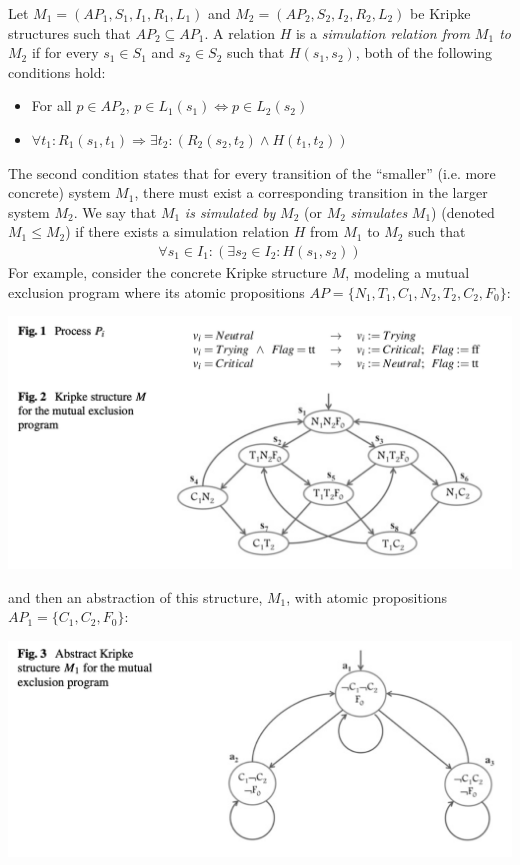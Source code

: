 \documentclass[10pt,a4paper]{article}
\begin{document}
Let $M_1=(AP_1,S_1,I_1,R_1,L_1)$ and $M_2=(AP_2,S_2,I_2,R_2,L_2)$ be Kripke structures such that $AP_2 \subseteq AP_1$. A relation $H$ is a \textit{simulation relation from $M_1$ to $M_2$} if for every $s_1 \in S_1$ and $s_2 \in S_2$ such that $H(s_1,s_2)$, both of the following conditions hold:
\begin{itemize}
    \item For all $p \in AP_2$, $p \in L_1(s_1) \iff p \in L_2(s_2)$
    \item $\forall t_1 :  R_1(s_1,t_1) \Rightarrow \exists t_2 : (R_2(s_2,t_2) \wedge H(t_1,t_2))$
\end{itemize}
The second condition states that for every transition of the ``smaller'' (i.e. more concrete) system $M_1$, there must exist a corresponding transition in the larger system $M_2$. We say that $M_1$ \textit{is simulated by} $M_2$ (or $M_2$ \textit{simulates} $M_1$) (denoted $M_1 \leq M_2$) if there exists a simulation relation $H$ from $M_1$ to $M_2$ such that 
\begin{align*}
    \forall s_1 \in I_1 : (\exists s_2 \in I_2 : H(s_1,s_2))
\end{align*}
For example, consider the concrete Kripke structure $M$, modeling a mutual exclusion program where its atomic propositions $AP=\{N_1,T_1,C_1,N_2,T_2,C_2,F_0\}$:
\begin{center}
    \includegraphics[scale=0.35]{images/concrete-mutex.png}
\end{center}
and then an abstraction of this structure, $M_1$, with atomic propositions $AP_1=\{C_1,C_2,F_0\}$:
\begin{center}
    \includegraphics[scale=0.35]{images/abstract-mutex.png}
\end{center}
\end{document}
